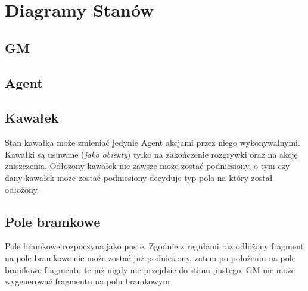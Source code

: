 \documentclass[../Dokumentacja.tex]{subfiles}
\begin{document}
\section{Diagramy Stanów}
\subsection{GM}
\subsection{Agent}
\subsection{Kawałek}
Stan kawałka może zmieniać jedynie Agent akcjami przez niego wykonywalnymi. Kawałki są usuwane (\textit{jako obiekty}) tylko na
zakończenie rozgrywki oraz na akcję zniszczenia. Odłożony kawałek nie zawsze może zostać podniesiony, o tym czy dany kawałek może
zostać podniesiony decyduje typ pola na który został odłożony.
\subsection{Pole bramkowe}
Pole bramkowe rozpoczyna jako puste. Zgodnie z regułami raz odłożony fragment na pole bramkowe nie może zostać już podniesiony, zatem
po położeniu na pole bramkowe fragmentu te już nigdy nie przejdzie do stanu pustego. GM nie może wygenerować fragmentu na polu bramkowym
\end{document}
